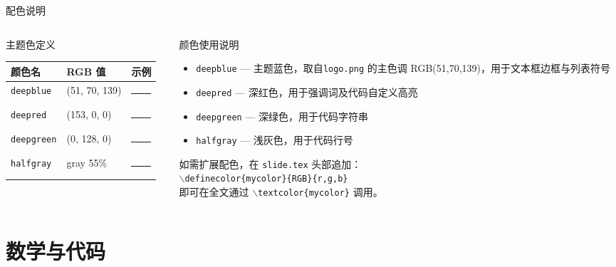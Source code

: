 \documentclass[aspectratio=169]{beamer}
\def\cmd#1{\texttt{\color{red}\footnotesize $\backslash$#1}}
\begin{document}
\begin{frame}{配色说明}
\begin{columns}[T]
\begin{column}{0.50\textwidth}
\begin{aim*}{主题色定义}{}
\begin{tabular}{lll}
\toprule
\textbf{颜色名} & \textbf{RGB 值} & \textbf{示例} \\
\midrule
\texttt{deepblue}  & (51, 70, 139)  & \textcolor{deepblue}{\rule{1.2em}{0.8em}} \\
\texttt{deepred}   & (153, 0, 0)    & \textcolor{deepred}{\rule{1.2em}{0.8em}} \\
\texttt{deepgreen} & (0, 128, 0)    & \textcolor{deepgreen}{\rule{1.2em}{0.8em}} \\
\texttt{halfgray}  & gray 55\%      & \textcolor{halfgray}{\rule{1.2em}{0.8em}} \\
\bottomrule
\end{tabular}
\end{aim*}
\end{column}
\begin{column}{0.46\textwidth}
\begin{aim*}{颜色使用说明}{}
\begin{itemize}[left=0pt,label=\textcolor{deepblue}{}]
    \item \texttt{deepblue} — 主题蓝色，取自\texttt{logo.png} 的主色调 RGB(51,70,139)，用于文本框边框与列表符号
    \item \texttt{deepred} — 深红色，用于强调词及代码自定义高亮
    \item \texttt{deepgreen} — 深绿色，用于代码字符串
    \item \texttt{halfgray} — 浅灰色，用于代码行号
\end{itemize}
\medskip
如需扩展配色，在 \texttt{slide.tex} 头部追加：\\[0.3em]
{\small\texttt{\cmd{definecolor}\{mycolor\}\{RGB\}\{r,g,b\}}}\\[0.2em]
即可在全文通过 \cmd{textcolor}\texttt{\{mycolor\}} 调用。
\end{aim*}
\end{column}
\end{columns}
\end{frame}

\section{数学与代码}
\end{document}
